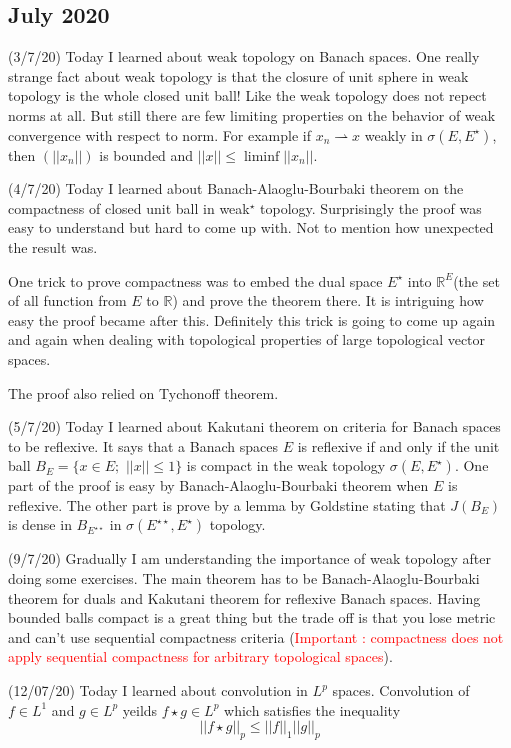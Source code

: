 \documentclass[12pt,a4paper]{article}
\begin{document}
\subsection*{July 2020}


\quad (3/7/20) Today I learned about weak topology on Banach spaces. One really strange fact about weak topology is that the closure of unit sphere in weak topology is the whole closed unit ball! Like the weak topology does not repect norms at all. But still there are few limiting properties on the behavior of weak convergence with respect to norm. For example if $x_n \rightharpoonup x$  weakly in $\sigma(E,E^{\star})$, then $(||x_n||)$ is bounded and $||x|| \le \liminf||x_n||$.


(4/7/20) Today I learned about Banach-Alaoglu-Bourbaki theorem on the compactness of closed unit ball in weak$^\star$ topology. Surprisingly the proof was easy to understand but hard to come up with. Not to mention how unexpected the result was.

One trick to prove compactness was to embed the dual space $E^{\star}$ into $\mathbb{R}^E$(the set of all function from $E$ to $\mathbb{R}$) and prove the theorem there. It is intriguing how easy the proof became after this. Definitely this trick is going to come up again and again when dealing with topological properties of large topological vector spaces.

The proof also relied on Tychonoff theorem.

(5/7/20) Today I learned about Kakutani theorem on criteria for Banach spaces to be reflexive. It says that a Banach spaces $E$ is reflexive if and only if the unit ball $B_E = \{x \in E ; \, \,||x|| \le 1 \}$ is compact in the weak topology $\sigma(E,E^{\star})$. One part of the proof is easy by Banach-Alaoglu-Bourbaki theorem when $E$ is reflexive. The other part is prove by a lemma by Goldstine stating that $J(B_E)$ is dense in $B_{E^{\star\star}}$ in $\sigma(E^{\star\star},E^{\star})$ topology.

(9/7/20) Gradually I am understanding the importance of weak topology after doing some exercises. The main theorem has to be Banach-Alaoglu-Bourbaki theorem for duals and Kakutani theorem for reflexive Banach spaces. Having bounded balls compact is a great thing but the trade off is that you lose metric and can't use sequential compactness criteria (\textcolor{red}{Important : compactness does not apply sequential compactness for arbitrary topological spaces}).

(12/07/20) Today I learned about convolution in $L^p$ spaces. Convolution of  $f \in L^1$ and $g \in L^p$ yeilds $f \star g \in L^p$ which satisfies the inequality
\[ ||f \star g ||_p \le ||f||_1 ||g||_p \]  
\end{document}
